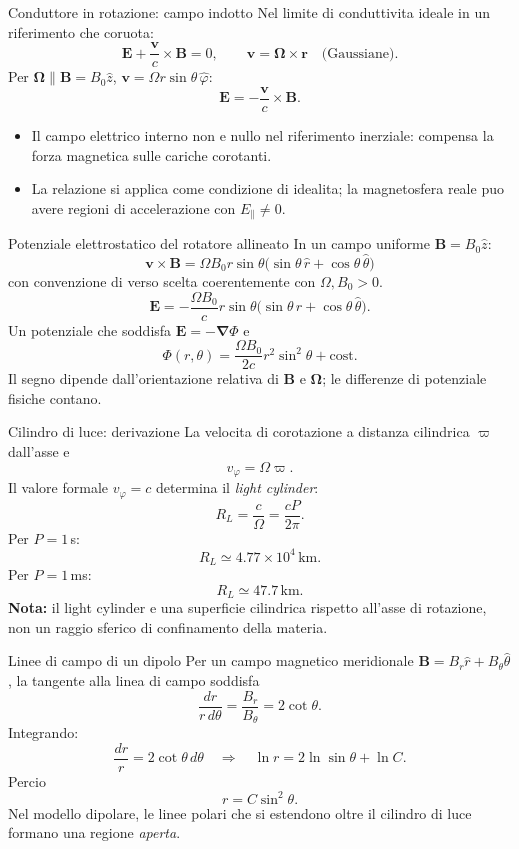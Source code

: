 \begin{frame}[t]{Conduttore in rotazione: campo indotto}
\small
Nel limite di conduttivita ideale in un riferimento che coruota:
\[
\mathbf E+\frac{\mathbf v}{c}\times\mathbf B=0,
\qquad \mathbf v=\boldsymbol\Omega\times\mathbf r
\quad\text{(Gaussiane).}
\]
Per $\boldsymbol\Omega\parallel\mathbf B=B_0\hat z$, $\mathbf v=\Omega r\sin\theta\,\hat\varphi$:
\[
\mathbf E=-\frac{\mathbf v}{c}\times\mathbf B.
\]
\begin{itemize}
\item Il campo elettrico interno non e nullo nel riferimento inerziale: compensa la forza magnetica sulle cariche corotanti.
\item La relazione si applica come condizione di idealita; la magnetosfera reale puo avere regioni di accelerazione con $E_\parallel\neq0$.
\end{itemize}
\end{frame}

\begin{frame}[t]{Potenziale elettrostatico del rotatore allineato}
\small
In un campo uniforme $\mathbf B=B_0\hat z$:
\[
\mathbf v\times\mathbf B
=\Omega B_0 r\sin\theta
\bigl(\sin\theta\,\hat r+\cos\theta\,\hat\theta\bigr)
\]
con convenzione di verso scelta coerentemente con $\Omega,B_0>0$.
\[
\mathbf E=-\frac{\Omega B_0}{c}r\sin\theta
\bigl(\sin\theta\,\hat r+\cos\theta\,\hat\theta\bigr).
\]
Un potenziale che soddisfa $\mathbf E=-\boldsymbol\nabla\Phi$ e
\[
\Phi(r,\theta)=\frac{\Omega B_0}{2c}r^2\sin^2\theta+\text{cost}.
\]
Il segno dipende dall'orientazione relativa di $\mathbf B$ e $\boldsymbol\Omega$; le differenze di potenziale fisiche contano.
\end{frame}

\begin{frame}[t]{Cilindro di luce: derivazione}
\small
La velocita di corotazione a distanza cilindrica $\varpi$ dall'asse e
\[
v_\varphi=\Omega\varpi.
\]
Il valore formale $v_\varphi=c$ determina il \emph{light cylinder}:
\[
R_L=\frac c\Omega=\frac{cP}{2\pi}.
\]
Per $P=1\,$s:
\[
R_L\simeq4.77\times10^4\,\mathrm{km}.
\]
Per $P=1\,$ms:
\[
R_L\simeq47.7\,\mathrm{km}.
\]
\textbf{Nota:} il light cylinder e una superficie cilindrica rispetto all'asse di rotazione, non un raggio sferico di confinamento della materia.
\end{frame}

\begin{frame}[t]{Linee di campo di un dipolo}
\small
Per un campo magnetico meridionale $\mathbf B=B_r\hat r+B_\theta\hat\theta$, la tangente alla linea di campo soddisfa
\[
\frac{dr}{r\,d\theta}=\frac{B_r}{B_\theta}
=2\cot\theta.
\]
Integrando:
\[
\frac{dr}{r}=2\cot\theta\,d\theta
\quad\Rightarrow\quad
\ln r=2\ln\sin\theta+\ln C.
\]
Percio
\[
r=C\sin^2\theta.
\]
Nel modello dipolare, le linee polari che si estendono oltre il cilindro di luce formano una regione \emph{aperta}.
\end{frame}

